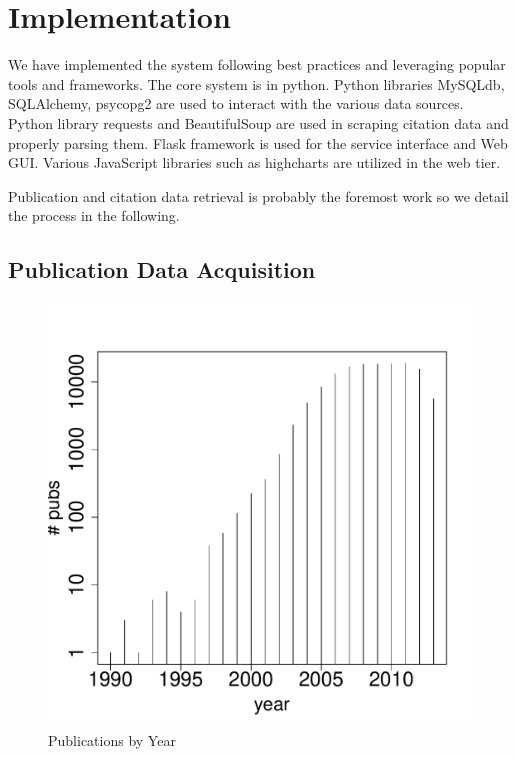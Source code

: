 \section{Implementation}

We have implemented the system following best practices and leveraging popular tools and frameworks. The core system is in python. Python libraries MySQLdb, SQLAlchemy, psycopg2 are used to interact with the various data sources. Python library requests and BeautifulSoup are used in scraping citation data and properly parsing them. Flask framework is used for the service interface and Web GUI. Various JavaScript libraries such as highcharts are utilized in the web tier.

Publication and citation data retrieval is probably the foremost work so we detail the process in the following.

\subsection{Publication Data Acquisition}

\begin{figure}[htb]
  \centering
    \includegraphics[width=1.0\columnwidth]{images/21_pubs_year_distribution.pdf}
  \caption{Publications by Year}\label{F:pubs-year-distribution}
\end{figure}

